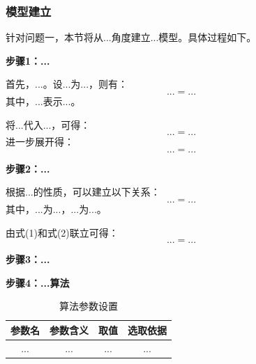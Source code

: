 %
\subsubsection{模型建立}

针对问题一，本节将从...角度建立...模型。具体过程如下。

\textbf{步骤1：...}

首先，...。设...为...，则有：
\begin{equation}
    ... = ...
\end{equation}
其中，$...$表示...。

将...代入...，可得：
\begin{equation}
    ... = ...
\end{equation}
进一步展开得：
\begin{equation}
    ... = ...
\end{equation}

\textbf{步骤2：...}

根据...的性质，可以建立以下关系：
\begin{equation}
    ... = ...
\end{equation}
其中，$...$为...，$...$为...。

由式(1)和式(2)联立可得：
\begin{equation}
    ... = ...
\end{equation}

\textbf{步骤3：...}


\textbf{步骤4：...算法}


\begin{table}[H]
  \centering
  \caption{算法参数设置}
  \begin{tabularx}{\textwidth}{CCCC}
    \toprule
    参数名 & 参数含义 & 取值 & 选取依据 \\
    \midrule
    ... & ... & ... & ... \\
    \bottomrule
  \end{tabularx}
  \label{tab:参数1}
\end{table}

